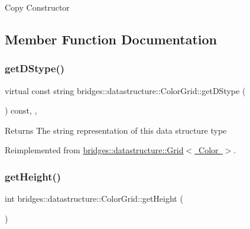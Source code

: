 Copy Constructor 

\subsection{Member Function Documentation}
\mbox{\label{classbridges_1_1datastructure_1_1_color_grid_afad945d648b427ca183a1dface8249b7}} 
\subsubsection{\texorpdfstring{getDStype()}{getDStype()}}
{\footnotesize\ttfamily virtual const string bridges\+::datastructure\+::\+Color\+Grid\+::get\+D\+Stype (\begin{DoxyParamCaption}{ }\end{DoxyParamCaption}) const\hspace{0.3cm}{\ttfamily [inline]}, {\ttfamily [override]}, {\ttfamily [virtual]}}

\begin{DoxyReturn}{Returns}
The string representation of this data structure type 
\end{DoxyReturn}


Reimplemented from \mbox{\hyperlink{classbridges_1_1datastructure_1_1_grid_a16aeae38446b96f440dea15f2b19334d}{bridges\+::datastructure\+::\+Grid$<$ Color $>$}}.

\mbox{\label{classbridges_1_1datastructure_1_1_color_grid_ab437905ec904f941cd58d3393c3a5700}} 
\subsubsection{\texorpdfstring{getHeight()}{getHeight()}}
{\footnotesize\ttfamily int bridges\+::datastructure\+::\+Color\+Grid\+::get\+Height (\begin{DoxyParamCaption}{ }\end{DoxyParamCaption})\hspace{0.3cm}{\ttfamily [inline]}}

